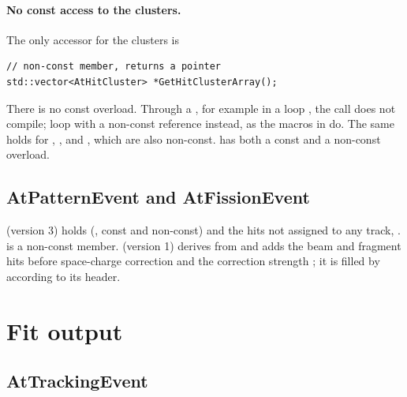 \paragraph{No const access to the clusters.} The only accessor for the clusters is
\begin{verbatim}
// non-const member, returns a pointer
std::vector<AtHitCluster> *GetHitClusterArray();
\end{verbatim}
There is no const overload. Through a , for example in a loop
, the call does not compile; loop with a
non-const reference instead, as the macros in  do. The same holds for ,
,  and , which are also non-const.
 has both a const and a non-const overload.

\subsection{AtPatternEvent and AtFissionEvent}

 (version 3) holds  (,
const and non-const) and the hits not assigned to any track, .  is a
non-const member.  (version 1) derives from  and adds the beam
and fragment hits before space-charge correction and the correction strength ; it is filled
by  according to its header.

\section{Fit output}
\label{sec:dm-fit}

\subsection{AtTrackingEvent}

